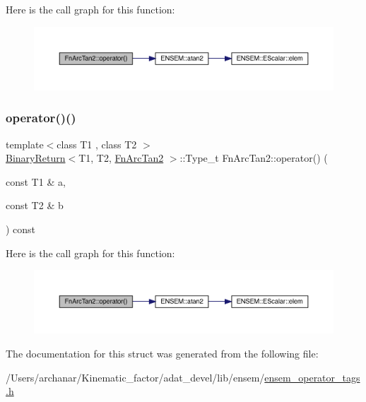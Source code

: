 Here is the call graph for this function\+:
\nopagebreak
\begin{figure}[H]
\begin{center}
\leavevmode
\includegraphics[width=350pt]{d0/d07/structFnArcTan2_a919de5b0c020758f5280cc89b30e6133_cgraph}
\end{center}
\end{figure}
\mbox{\label{structFnArcTan2_a919de5b0c020758f5280cc89b30e6133}} 
\subsubsection{\texorpdfstring{operator()()}{operator()()}\hspace{0.1cm}{\footnotesize\ttfamily [2/2]}}
{\footnotesize\ttfamily template$<$class T1 , class T2 $>$ \\
\mbox{\hyperlink{structBinaryReturn}{Binary\+Return}}$<$T1, T2, \mbox{\hyperlink{structFnArcTan2}{Fn\+Arc\+Tan2}} $>$\+::Type\+\_\+t Fn\+Arc\+Tan2\+::operator() (\begin{DoxyParamCaption}\item[{const T1 \&}]{a,  }\item[{const T2 \&}]{b }\end{DoxyParamCaption}) const\hspace{0.3cm}{\ttfamily [inline]}}

Here is the call graph for this function\+:
\nopagebreak
\begin{figure}[H]
\begin{center}
\leavevmode
\includegraphics[width=350pt]{d0/d07/structFnArcTan2_a919de5b0c020758f5280cc89b30e6133_cgraph}
\end{center}
\end{figure}


The documentation for this struct was generated from the following file\+:\begin{DoxyCompactItemize}
\item 
/\+Users/archanar/\+Kinematic\+\_\+factor/adat\+\_\+devel/lib/ensem/\mbox{\hyperlink{lib_2ensem_2ensem__operator__tags_8h}{ensem\+\_\+operator\+\_\+tags.\+h}}\end{DoxyCompactItemize}
